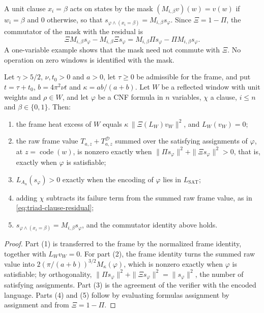 A unit clause \(x_{i}=\beta\) acts on states by the mask
\((M_{i,\beta}v)(w)=v(w)\) if \(w_{i}=\beta\) and \(0\) otherwise, so
that \(s_{\varphi\wedge(x_{i}=\beta)}=M_{i,\beta}s_{\varphi}\).  Since
\(\Xi=1-\Pi\), the commutator of the mask with the residual is
\[
  \Xi M_{i,\beta}s_{\varphi}-M_{i,\beta}\Xi s_{\varphi}
  =M_{i,\beta}\Pi s_{\varphi}-\Pi M_{i,\beta}s_{\varphi}.
\]
A one-variable example shows that the mask need not commute with
\(\Xi\).  No operation on zero windows is identified with the mask.

\begin{theorem}
\label{thm:concrete-triad-gaussian-xi}
Let \(\gamma>5/2\), \(\nu,t_{0}>0\) and \(a>0\), let \(\tau\ge0\) be
admissible for the frame, and put \(t=\tau+t_{0}\),
\(b=4\pi^{2}\nu t\) and \(\kappa=ab/(a+b)\).  Let \(W\) be a reflected
window with unit weights and \(\rho\in W\), and let \(\varphi\) be a CNF
formula in \(n\) variables, \(\chi\) a clause, \(i\le n\) and
\(\beta\in\{0,1\}\).  Then:
\begin{enumerate}
\item the frame heat excess of \(W\) equals
  \(\kappa\,\|\Xi(L_{W})v_{W}\|^{2}\), and \(L_{W}(v_{W})=0\);
\item the raw frame value \(T_{a,z}+T^{\mathcal D}_{a,z}\) summed over the
  satisfying assignments of \(\varphi\), at \(z=\operatorname{code}(w)\),
  is nonzero exactly when
  \(\|\Pi s_{\varphi}\|^{2}+\|\Xi s_{\varphi}\|^{2}>0\), that is, exactly
  when \(\varphi\) is satisfiable;
\item \(L_{A_{n}}(s_{\varphi})>0\) exactly when the encoding of
  \(\varphi\) lies in \(L_{\mathrm{SAT}}\);
\item adding \(\chi\) subtracts its failure term from the summed raw
  frame value, as in \eqref{eq:triad-clause-residual};
\item \(s_{\varphi\wedge(x_{i}=\beta)}=M_{i,\beta}s_{\varphi}\), and the
  commutator identity above holds.
\end{enumerate}
\end{theorem}

\begin{proof}
Part (1) is  transferred to the frame by
the normalized frame identity, together with \(L_{W}v_{W}=0\).  For
part (2), the frame identity turns the summed raw value into
\(2(\pi/(a+b))^{3/2}M_{\kappa}(\varphi)\), which is nonzero exactly when
\(\varphi\) is satisfiable; by orthogonality,
\(\|\Pi s_{\varphi}\|^{2}+\|\Xi s_{\varphi}\|^{2}=\|s_{\varphi}\|^{2}\),
the number of satisfying assignments.  Part (3) is the agreement of the
verifier with the encoded language.  Parts (4) and (5) follow by
evaluating formulas assignment by assignment and from \(\Xi=1-\Pi\).
\end{proof}

